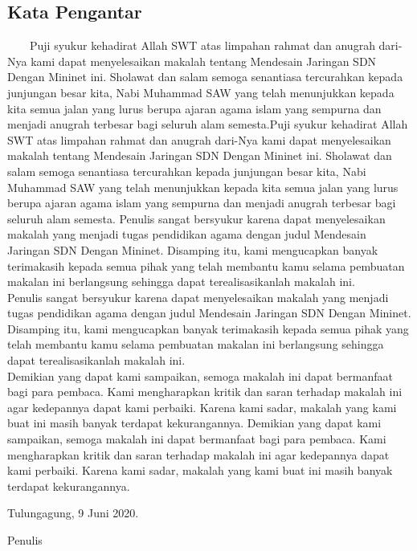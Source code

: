 \begin{center}
\section{Kata Pengantar}
\end{center}

\ \ \ \  Puji syukur kehadirat Allah SWT atas limpahan rahmat dan anugrah dari-Nya kami dapat menyelesaikan
makalah tentang Mendesain Jaringan SDN Dengan Mininet ini. Sholawat dan salam semoga senantiasa tercurahkan
kepada junjungan besar kita, Nabi Muhammad SAW yang telah menunjukkan kepada kita semua jalan yang lurus berupa ajaran
agama islam yang sempurna dan menjadi anugrah terbesar bagi seluruh alam semesta.Puji syukur kehadirat Allah SWT
atas limpahan rahmat dan anugrah dari-Nya kami dapat menyelesaikan makalah tentang Mendesain Jaringan SDN Dengan
Mininet ini. Sholawat dan salam semoga senantiasa tercurahkan kepada junjungan besar kita, Nabi Muhammad SAW yang
telah menunjukkan kepada kita semua jalan yang lurus berupa ajaran agama islam yang sempurna dan menjadi anugrah
terbesar bagi seluruh alam semesta.
Penulis sangat bersyukur karena dapat menyelesaikan makalah yang menjadi tugas pendidikan agama dengan
judul Mendesain Jaringan SDN Dengan Mininet. Disamping itu, kami mengucapkan banyak terimakasih kepada semua
pihak yang telah membantu kamu selama pembuatan makalan ini berlangsung sehingga dapat terealisasikanlah makalah
ini. \\

Penulis sangat bersyukur karena dapat menyelesaikan makalah yang menjadi tugas pendidikan agama dengan judul
Mendesain Jaringan SDN Dengan Mininet. Disamping itu, kami mengucapkan banyak terimakasih kepada semua pihak yang
telah membantu kamu selama pembuatan makalan ini berlangsung sehingga dapat terealisasikanlah makalah ini.\\

Demikian yang dapat kami sampaikan, semoga makalah ini dapat bermanfaat bagi para pembaca. Kami
mengharapkan kritik dan saran terhadap makalah ini agar kedepannya dapat kami perbaiki. Karena kami sadar, makalah yang
kami buat ini masih banyak terdapat kekurangannya. Demikian yang dapat kami sampaikan, semoga makalah ini dapat
bermanfaat bagi para pembaca. Kami mengharapkan kritik dan saran terhadap makalah ini agar kedepannya dapat kami
perbaiki. Karena kami sadar, makalah yang kami buat ini masih banyak terdapat kekurangannya.

\bigskip

\bigskip

\begin{flushright}
Tulungagung, 9 Juni 2020.

\bigskip

Penulis 
\end{flushright}
